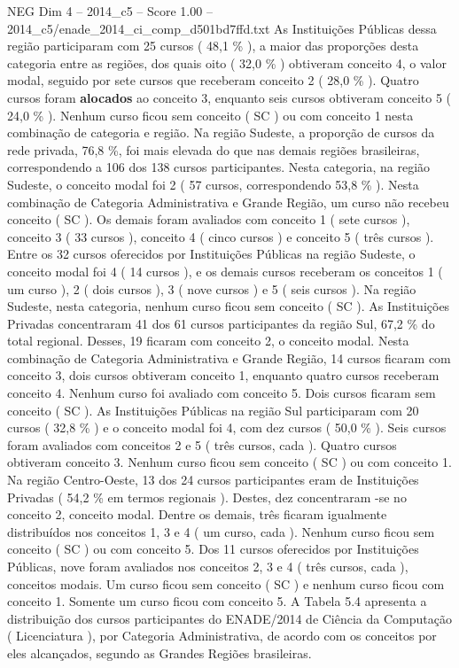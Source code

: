 \begin{textsample}{NEG Dim 4 – 2014\_c5 – Score 1.00 – 2014\_c5/enade\_2014\_ci\_comp\_d501bd7ffd.txt}
As Instituições Públicas dessa região participaram com 25 cursos ( 48,1 \% ), a maior das proporções desta categoria entre as regiões, dos quais oito ( 32,0 \% ) obtiveram conceito 4, o valor modal, seguido por sete cursos que receberam conceito 2 ( 28,0 \% ).
Quatro cursos foram \textbf{alocados} ao conceito 3, enquanto seis cursos obtiveram conceito 5 ( 24,0 \% ).
Nenhum curso ficou sem conceito ( SC ) ou com conceito 1 nesta combinação de categoria e região.
Na região Sudeste, a proporção de cursos da rede privada, 76,8 \%, foi mais elevada do que nas demais regiões brasileiras, correspondendo a 106 dos 138 cursos participantes.
Nesta categoria, na região Sudeste, o conceito modal foi 2 ( 57 cursos, correspondendo 53,8 \% ).
Nesta combinação de Categoria Administrativa e Grande Região, um curso não recebeu conceito ( SC ).
Os demais foram avaliados com conceito 1 ( sete cursos ), conceito 3 ( 33 cursos ), conceito 4 ( cinco cursos ) e conceito 5 ( três cursos ).
Entre os 32 cursos oferecidos por Instituições Públicas na região Sudeste, o conceito modal foi 4 ( 14 cursos ), e os demais cursos receberam os conceitos 1 ( um curso ), 2 ( dois cursos ), 3 ( nove cursos ) e 5 ( seis cursos ).
Na região Sudeste, nesta categoria, nenhum curso ficou sem conceito ( SC ).
As Instituições Privadas concentraram 41 dos 61 cursos participantes da região Sul, 67,2 \% do total regional.
Desses, 19 ficaram com conceito 2, o conceito modal.
Nesta combinação de Categoria Administrativa e Grande Região, 14 cursos ficaram com conceito 3, dois cursos obtiveram conceito 1, enquanto quatro cursos receberam conceito 4.
Nenhum curso foi avaliado com conceito 5.
Dois cursos ficaram sem conceito ( SC ).
As Instituições Públicas na região Sul participaram com 20 cursos ( 32,8 \% ) e o conceito modal foi 4, com dez cursos ( 50,0 \% ).
Seis cursos foram avaliados com conceitos 2 e 5 ( três cursos, cada ).
Quatro cursos obtiveram conceito 3.
Nenhum curso ficou sem conceito ( SC ) ou com conceito 1.
Na região Centro-Oeste, 13 dos 24 cursos participantes eram de Instituições Privadas ( 54,2 \% em termos regionais ).
Destes, dez concentraram -se no conceito 2, conceito modal.
Dentre os demais, três ficaram igualmente distribuídos nos conceitos 1, 3 e 4 ( um curso, cada ).
Nenhum curso ficou sem conceito ( SC ) ou com conceito 5.
Dos 11 cursos oferecidos por Instituições Públicas, nove foram avaliados nos conceitos 2, 3 e 4 ( três cursos, cada ), conceitos modais.
Um curso ficou sem conceito ( SC ) e nenhum curso ficou com conceito 1.
Somente um curso ficou com conceito 5.
A Tabela 5.4 apresenta a distribuição dos cursos participantes do ENADE/2014 de Ciência da Computação ( Licenciatura ), por Categoria Administrativa, de acordo com os conceitos por eles alcançados, segundo as Grandes Regiões brasileiras.

\end{textsample}
